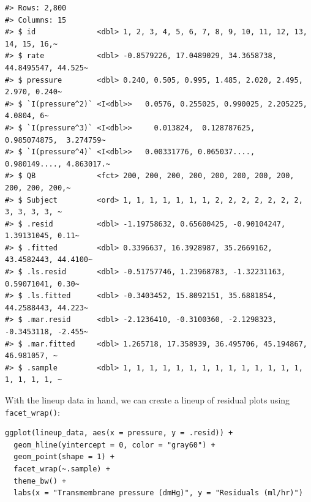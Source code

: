 \begin{verbatim}
#> Rows: 2,800
#> Columns: 15
#> $ id              <dbl> 1, 2, 3, 4, 5, 6, 7, 8, 9, 10, 11, 12, 13, 14, 15, 16,~
#> $ rate            <dbl> -0.8579226, 17.0489029, 34.3658738, 44.8495547, 44.525~
#> $ pressure        <dbl> 0.240, 0.505, 0.995, 1.485, 2.020, 2.495, 2.970, 0.240~
#> $ `I(pressure^2)` <I<dbl>>   0.0576, 0.255025, 0.990025, 2.205225,   4.0804, 6~
#> $ `I(pressure^3)` <I<dbl>>     0.013824,  0.128787625,  0.985074875,  3.274759~
#> $ `I(pressure^4)` <I<dbl>>   0.00331776, 0.065037...., 0.980149...., 4.863017.~
#> $ QB              <fct> 200, 200, 200, 200, 200, 200, 200, 200, 200, 200, 200,~
#> $ Subject         <ord> 1, 1, 1, 1, 1, 1, 1, 2, 2, 2, 2, 2, 2, 2, 3, 3, 3, 3, ~
#> $ .resid          <dbl> -1.19758632, 0.65600425, -0.90104247, 1.39131045, 0.11~
#> $ .fitted         <dbl> 0.3396637, 16.3928987, 35.2669162, 43.4582443, 44.4100~
#> $ .ls.resid       <dbl> -0.51757746, 1.23968783, -1.32231163, 0.59071041, 0.30~
#> $ .ls.fitted      <dbl> -0.3403452, 15.8092151, 35.6881854, 44.2588443, 44.223~
#> $ .mar.resid      <dbl> -2.1236410, -0.3100360, -2.1298323, -0.3453118, -2.455~
#> $ .mar.fitted     <dbl> 1.265718, 17.358939, 36.495706, 45.194867, 46.981057, ~
#> $ .sample         <dbl> 1, 1, 1, 1, 1, 1, 1, 1, 1, 1, 1, 1, 1, 1, 1, 1, 1, 1, ~
\end{verbatim}

\noindent With the lineup data in hand, we can create a lineup of residual plots using \texttt{facet\_wrap()}:

\begin{verbatim}
ggplot(lineup_data, aes(x = pressure, y = .resid)) +
  geom_hline(yintercept = 0, color = "gray60") +
  geom_point(shape = 1) +
  facet_wrap(~.sample) +
  theme_bw() +
  labs(x = "Transmembrane pressure (dmHg)", y = "Residuals (ml/hr)")
\end{verbatim}

